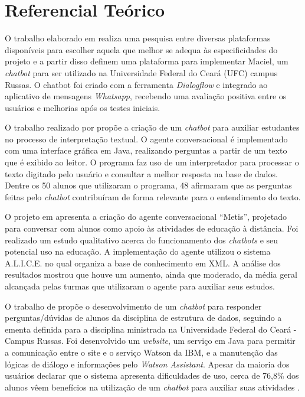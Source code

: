 \documentclass[12pt]{article}
\begin{document}
\section{ Referencial Teórico}

O trabalho elaborado em \cite{maciel:19} realiza uma pesquisa entre diversas plataformas disponíveis para escolher aquela que melhor se adequa às especificidades do projeto e a partir disso definem uma plataforma para implementar Maciel, um {\itshape chatbot} para ser utilizado na Universidade Federal do Ceará (UFC) campus Russas. O chatbot foi criado com a ferramenta {\itshape Dialogflow} e integrado ao aplicativo de mensagens {\itshape Whatsapp}, recebendo uma avaliação positiva entre os usuários e melhorias após os testes iniciais.

O trabalho realizado por \cite{bulhoes:20} propõe a criação de um {\itshape chatbot} para auxiliar estudantes no processo de interpretação textual. O agente conversacional é implementado com uma interface gráfica em Java, realizando perguntas a partir de um texto que é exibido ao leitor. O programa faz uso de um interpretador para processar o texto digitado pelo usuário e consultar a melhor resposta na base de dados. Dentre os 50 alunos que utilizaram o programa, 48 afirmaram que as perguntas feitas pelo {\itshape chatbot} contribuíram de forma relevante para o entendimento do texto.


O projeto em \cite{lucchesi:18} apresenta a criação do agente conversacional “Metis”, projetado para conversar com alunos como apoio às atividades de educação à distância. Foi realizado um estudo qualitativo acerca do funcionamento dos {\itshape chatbots} e seu potencial uso na educação. A implementação do agente utilizou o sistema A.L.I.C.E. no qual organiza a base de conhecimento em XML. A análise dos resultados mostrou que houve um aumento, ainda que moderado, da média geral alcançada pelas turmas que utilizaram o agente para auxiliar seus estudos.

O trabalho de \cite{araujo:20} propõe o desenvolvimento de um {\itshape chatbot} para responder perguntas/dúvidas de alunos da disciplina de estrutura de dados, seguindo a ementa definida para a disciplina ministrada na Universidade Federal do Ceará - Campus Russas. Foi desenvolvido um {\itshape website}, um serviço em Java para permitir a comunicação entre o site e o serviço Watson da IBM, e a manutenção das lógicas de diálogo e informações pelo {\itshape Watson Assistant}. Apesar da maioria dos usuários declarar que o sistema apresenta dificuldades de uso, cerca de 76,8\% dos alunos  vêem benefícios na utilização de um {\itshape chatbot} para auxiliar suas atividades   .
\end{document}
